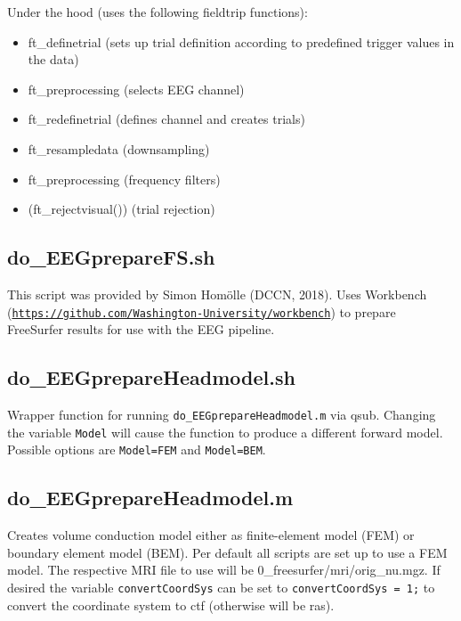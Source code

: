 \documentclass[12pt,a4paper]{scrartcl}
\begin{document}
\noindent Under the hood (uses the following fieldtrip functions):
\begin{itemize}
\item ft\_definetrial (sets up trial definition according to predefined trigger values in the data)
\item ft\_preprocessing (selects EEG channel)
\item ft\_redefinetrial (defines channel and creates trials)
\item ft\_resampledata (downsampling)
\item ft\_preprocessing (frequency filters)
\item (ft\_rejectvisual()) (trial rejection)
\end{itemize}

\subsection{do\_EEGprepareFS.sh}
\label{sec:prepFS4EEG}
This script was provided by Simon Hom\"olle (DCCN, 2018). Uses Workbench (\href{https://github.com/Washington-University/workbench}{\nolinkurl{https://github.com/Washington-University/workbench}}) to prepare FreeSurfer results for use with the EEG pipeline.

\subsection{do\_EEGprepareHeadmodel.sh}
\label{sec:prepHM}
Wrapper function for running \texttt{do\_EEGprepareHeadmodel.m} via qsub. Changing the variable \texttt{Model} will cause the function to produce a different forward model. Possible options are \texttt{Model=FEM} and \texttt{Model=BEM}.

\subsection{do\_EEGprepareHeadmodel.m}
Creates volume conduction model either as finite-element model (FEM) or boundary element model (BEM). Per default all scripts are set up to use a FEM model. The respective MRI file to use will be 0\_freesurfer/mri/orig\_nu.mgz. If desired the variable \texttt{convertCoordSys} can be set to \texttt{convertCoordSys = 1;} to convert the coordinate system to ctf (otherwise will be ras).\\
\end{document}
